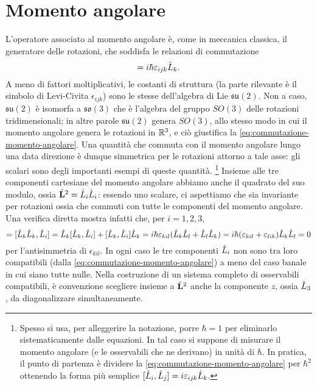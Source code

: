 \section{Momento angolare}
L'operatore associato al momento angolare è, come in meccanica classica, il generatore delle rotazioni, che soddisfa le relazioni di commutazione
\begin{equation}
	[\op L_i,\op L_j]=i\hbar\epsilon_{ijk}\op L_k.
	\label{eq:commutazione-momento-angolare}
\end{equation}
A meno di fattori moltiplicativi, le costanti di struttura (la parte rilevante è il simbolo di Levi-Civita $\epsilon_{ijk}$) sono le stesse dell'algebra di Lie $\mathfrak{su}(2)$.
Non a caso, $\mathfrak{su}(2)$ è isomorfa a $\mathfrak{so}(3)$ che è l'algebra del gruppo $SO(3)$ delle rotazioni tridimensionali; in altre parole $\mathfrak{su}(2)$ genera $SO(3)$, allo stesso modo in cui il momento angolare genera le rotazioni in $\mathbb{R}^3$, e ciò giustifica la \eqref{eq:commutazione-momento-angolare}.
Una quantità che commuta con il momento angolare lungo una data direzione è dunque simmetrica per le rotazioni attorno a tale asse: gli scalari sono degli importanti esempi di queste quantità.
\footnote{
	Spesso si usa, per alleggerire la notazione, porre $\hbar=1$ per eliminarlo sistematicamente dalle equazioni.
	In tal caso si suppone di misurare il momento angolare (e le osservabili che ne derivano) in unità di $\hbar$.
	In pratica, il punto di partenza è dividere la \eqref{eq:commutazione-momento-angolare} per $\hbar^2$ ottenendo la forma più semplice $[\hat{L}_i,\hat{L}_j]=i\varepsilon_{ijk}\hat{L}_k$.
}
Insieme alle tre componenti cartesiane del momento angolare abbiamo anche il quadrato del suo modulo, ossia $\hat{\mathbf{L}}^2=\hat{L}_i\hat{L}_i$: essendo uno scalare, ci aspettiamo che sia invariante per rotazioni ossia che commuti con tutte le componenti del momento angolare.
Una verifica diretta mostra infatti che, per $i=1,2,3$,
\begin{equation}
	[\op{\vec L}^2,\op L_i]=[\op L_k\op L_k,\op L_i]=\op L_k[\op L_k,\op L_i]+[\op L_k,\op L_i]\op L_k=i\hbar\epsilon_{kil}(\op L_k\op L_l+\op L_l\op L_k)=i\hbar(\epsilon_{kil}+\epsilon_{lik})\op L_k\op L_l=0
\end{equation}
per l'antisimmetria di $\epsilon_{kil}$.
In ogni caso le tre componenti $\hat{L}_i$ non sono tra loro compatibili (dalla \eqref{eq:commutazione-momento-angolare}) a meno del caso banale in cui siano tutte nulle.
Nella costruzione di un sistema completo di osservabili compatibili, è convenzione scegliere insieme a $\hat{\mathbf{L}}^2$ anche la componente $z$, ossia $\hat{L}_3$, da diagonalizzare simultaneamente.

